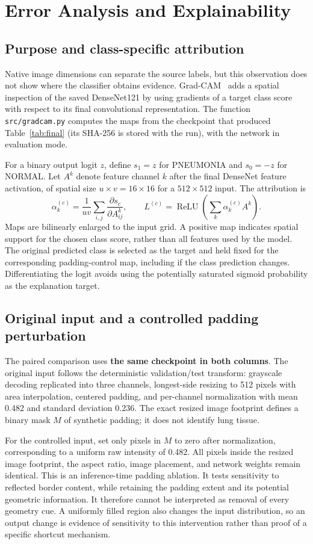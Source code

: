 \documentclass[12pt,letterpaper]{article}
\begin{document}
\section{Error Analysis and Explainability}
\label{sec:xai}
\subsection{Purpose and class-specific attribution}
Native image dimensions can separate the source labels, but this observation does not show where the classifier obtains evidence. Grad-CAM~\cite{selvaraju2017gradcam} adds a spatial inspection of the saved DenseNet121 by using gradients of a target class score with respect to its final convolutional representation. The function \texttt{src/gradcam.py} computes the maps from the checkpoint that produced Table~\ref{tab:final} (its SHA-256 is stored with the run), with the network in evaluation mode.

For a binary output logit $z$, define $s_1=z$ for PNEUMONIA and $s_0=-z$ for NORMAL. Let $A^k$ denote feature channel $k$ after the final DenseNet feature activation, of spatial size $u\times v=16\times16$ for a $512\times512$ input. The attribution is
\[
\alpha_k^{(c)}=\frac{1}{uv}\sum_{i,j}\frac{\partial s_c}{\partial A^k_{ij}},
\qquad
L^{(c)}=\operatorname{ReLU}\!\left(\sum_k\alpha_k^{(c)}A^k\right).
\]
Maps are bilinearly enlarged to the input grid. A positive map indicates spatial support for the chosen class score, rather than all features used by the model. The original predicted class is selected as the target and held fixed for the corresponding padding-control map, including if the class prediction changes. Differentiating the logit avoids using the potentially saturated sigmoid probability as the explanation target.

\subsection{Original input and a controlled padding perturbation}
The paired comparison uses \textbf{the same checkpoint in both columns}. The original input follows the deterministic validation/test transform: grayscale decoding replicated into three channels, longest-side resizing to 512 pixels with area interpolation, centered padding, and per-channel normalization with mean 0.482 and standard deviation 0.236. The exact resized image footprint defines a binary mask $M$ of synthetic padding; it does not identify lung tissue.

For the controlled input, set only pixels in $M$ to zero after normalization, corresponding to a uniform raw intensity of 0.482. All pixels inside the resized image footprint, the aspect ratio, image placement, and network weights remain identical. This is an inference-time padding ablation. It tests sensitivity to reflected border content, while retaining the padding extent and its potential geometric information. It therefore cannot be interpreted as removal of every geometry cue. A uniformly filled region also changes the input distribution, so an output change is evidence of sensitivity to this intervention rather than proof of a specific shortcut mechanism.
\end{document}
